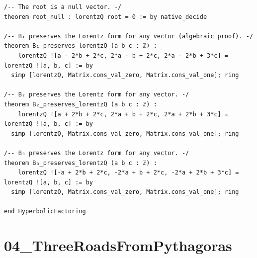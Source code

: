 \documentclass[11pt,openany]{book}
\theoremstyle{definition}
\theoremstyle{plain}
\theoremstyle{remark}
\begin{document}
\begin{lstlisting}[style=lean]
/-- The root is a null vector. -/
theorem root_null : lorentzQ root = 0 := by native_decide

/-- B₁ preserves the Lorentz form for any vector (algebraic proof). -/
theorem B₁_preserves_lorentzQ (a b c : ℤ) :
    lorentzQ ![a - 2*b + 2*c, 2*a - b + 2*c, 2*a - 2*b + 3*c] = lorentzQ ![a, b, c] := by
  simp [lorentzQ, Matrix.cons_val_zero, Matrix.cons_val_one]; ring

/-- B₂ preserves the Lorentz form for any vector. -/
theorem B₂_preserves_lorentzQ (a b c : ℤ) :
    lorentzQ ![a + 2*b + 2*c, 2*a + b + 2*c, 2*a + 2*b + 3*c] = lorentzQ ![a, b, c] := by
  simp [lorentzQ, Matrix.cons_val_zero, Matrix.cons_val_one]; ring

/-- B₃ preserves the Lorentz form for any vector. -/
theorem B₃_preserves_lorentzQ (a b c : ℤ) :
    lorentzQ ![-a + 2*b + 2*c, -2*a + b + 2*c, -2*a + 2*b + 3*c] = lorentzQ ![a, b, c] := by
  simp [lorentzQ, Matrix.cons_val_zero, Matrix.cons_val_one]; ring

end HyperbolicFactoring

\end{lstlisting}

\clearpage

\section*{04\_ThreeRoadsFromPythagoras}
\end{document}
